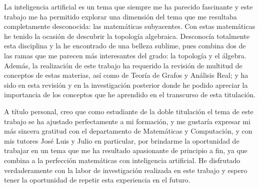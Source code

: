 \documentclass[12pt, a4paper, twoside]{book}
\numberwithin{equation}{section}
\theoremstyle{definition}
\theoremstyle{remark}
\theoremstyle{plain}
\begin{document}
	La inteligencia 
	artificial es un tema que siempre me ha parecido fascinante y este 
	trabajo me ha permitido explorar una dimensión del tema que me 
	resultaba completamente desconocida: las matemáticas subyacentes. Con 
	estas 
	matemáticas he tenido la ocasión de descubrir la topología algebraica. 
	Desconocía totalmente esta disciplina y la he encontrado de una 
	belleza sublime, pues combina dos de las ramas que me parecen más 
	interesantes del grado: la topología y el álgebra. Además, la 
	realización de este trabajo ha requerido la revisión de multitud de 
	conceptos de estas materias, así como de Teoría de Grafos y Análisis 
	Real; y ha sido en esta revisión y en la investigación posterior donde 
	he podido apreciar la importancia de los conceptos que 
	he aprendido en el transcurso de esta titulación. 
	
	A título personal, creo que como estudiante de la doble titulación el 
	tema de este trabajo se ha ajustado perfectamente a mi formación, y me 
	gustaría expresar mi más sincera gratitud con el departamento de 
	Matemáticas y Computación, y con mis tutores José 
	Luis y Julio en particular, por brindarme la oportunidad de trabajar 
	en un tema que me ha resultado apasionante de principio a fin, ya que 
	combina a la perfección matemáticas con inteligencia artificial. He 
	disfrutado verdaderamente con la labor de investigación realizada en 
	este trabajo y espero tener la oportunidad de repetir esta experiencia 
	en el futuro. 
	\nocite{*}
	
	
\end{document}

